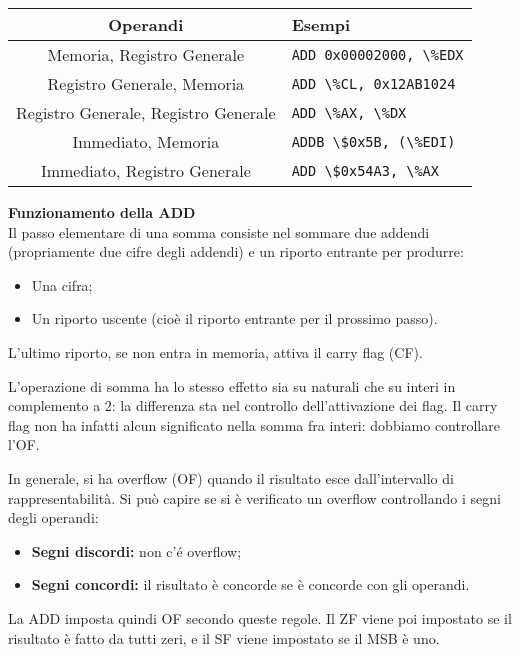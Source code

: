 \documentclass[a4paper,11pt]{article}
\begin{document}
		\begin{table}[h!]
			\center {}
			\begin{tabular} { c | p{5cm} }
				\bfseries Operandi & \bfseries Esempi \\
				\hline
				Memoria, Registro Generale & \lstinline|ADD 0x00002000, \%EDX| \\ 
				Registro Generale, Memoria & \lstinline|ADD \%CL, 0x12AB1024| \\ 
				Registro Generale, Registro Generale & \lstinline|ADD \%AX, \%DX| \\ 
				Immediato, Memoria & \lstinline|ADDB \$0x5B, (\%EDI)| \\ 
				Immediato, Registro Generale & \lstinline|ADD \$0x54A3, \%AX|
			\end{tabular}
		\end{table}

\par\medskip
\noindent
\textbf{\textsf{Funzionamento della ADD}} \\
Il passo elementare di una somma consiste nel sommare due addendi (propriamente due cifre degli addendi) e un riporto entrante per produrre:
	\begin{itemize}
		\item Una cifra;
		\item Un riporto uscente (cioè il riporto entrante per il prossimo passo).
	\end{itemize}
L'ultimo riporto, se non entra in memoria, attiva il carry flag (CF).

L'operazione di somma ha lo stesso effetto sia su naturali che su interi in complemento a 2: la differenza sta nel controllo dell'attivazione dei flag.
Il carry flag non ha infatti alcun significato nella somma fra interi: dobbiamo controllare l'OF.

In generale, si ha overflow (OF) quando il risultato esce dall'intervallo di rappresentabilità.
Si può capire se si è verificato un overflow controllando i segni degli operandi:
\begin{itemize}
	\item \textbf{Segni discordi:} non c'é overflow;
	\item \textbf{Segni concordi:} il risultato è concorde se è concorde con gli operandi.
\end{itemize}
La ADD imposta quindi OF secondo queste regole.
Il ZF viene poi impostato se il risultato è fatto da tutti zeri, e il SF viene impostato se il MSB è uno.
\end{document}
